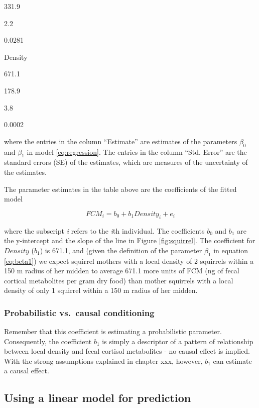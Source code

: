 \documentclass[]{book}
\begin{document}
331.9

2.2

0.0281

Density

671.1

178.9

3.8

0.0002

where the entries in the column ``Estimate'' are estimates of the
parameters \(\beta_0\) and \(\beta_1\) in model \eqref{eq:regression}. The
entries in the column ``Std. Error'' are the standard errors (SE) of the
estimates, which are measures of the uncertainty of the estimates.

The parameter estimates in the table above are the coefficients of the
fitted model

\begin{equation}
FCM_i = b_0 + b_1 Density_i + e_i
\label{eq:fcmi}
\end{equation}

where the subscript \emph{i} refers to the \emph{i}th individual. The
coefficients \(b_0\) and \(b_1\) are the y-intercept and the slope of
the line in Figure \ref{fig:squirrel}. The coefficient for \(Density\)
(\(b_1\)) is 671.1, and (given the definition of the parameter
\(\beta_1\) in equation \eqref{eq:beta1}) we expect squirrel mothers with
a local density of 2 squirrels within a 150 m radius of her midden to
average 671.1 more units of FCM (ng of fecal cortical metabolites per
gram dry food) than mother squirrels with a local density of only 1
squirrel within a 150 m radius of her midden.

\subsubsection{Probabilistic vs.~causal
conditioning}\label{probabilistic-vs.causal-conditioning}

Remember that this coefficient is estimating a probabilistic parameter.
Consequently, the coefficient \(b_1\) is simply a descriptor of a
pattern of relationship between local density and fecal cortisol
metabolites - no causal effect is implied. With the strong assumptions
explained in chapter xxx, however, \(b_1\) can estimate a causal effect.

\subsection{Using a linear model for
prediction}\label{using-a-linear-model-for-prediction}
\end{document}
